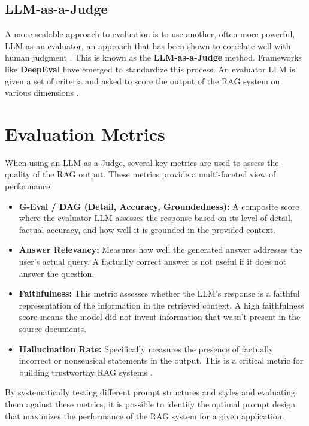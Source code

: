 \subsection{LLM-as-a-Judge}
A more scalable approach to evaluation is to use another, often more powerful, LLM as an evaluator, an approach that has been shown to correlate well with human judgment \autocite{zheng2023judging}. This is known as the \textbf{LLM-as-a-Judge} method. Frameworks like \textbf{DeepEval} have emerged to standardize this process. An evaluator LLM is given a set of criteria and asked to score the output of the RAG system on various dimensions \autocite{rag_eval_qdrant_2024}.

\section{Evaluation Metrics}
When using an LLM-as-a-Judge, several key metrics are used to assess the quality of the RAG output. These metrics provide a multi-faceted view of performance:
\begin{itemize}
    \item \textbf{G-Eval / DAG (Detail, Accuracy, Groundedness):} A composite score where the evaluator LLM assesses the response based on its level of detail, factual accuracy, and how well it is grounded in the provided context.
    \item \textbf{Answer Relevancy:} Measures how well the generated answer addresses the user's actual query. A factually correct answer is not useful if it does not answer the question.
    \item \textbf{Faithfulness:} This metric assesses whether the LLM's response is a faithful representation of the information in the retrieved context. A high faithfulness score means the model did not invent information that wasn't present in the source documents.
    \item \textbf{Hallucination Rate:} Specifically measures the presence of factually incorrect or nonsensical statements in the output. This is a critical metric for building trustworthy RAG systems \autocite{rag_eval_pinecone}.
\end{itemize}

By systematically testing different prompt structures and styles and evaluating them against these metrics, it is possible to identify the optimal prompt design that maximizes the performance of the RAG system for a given application.